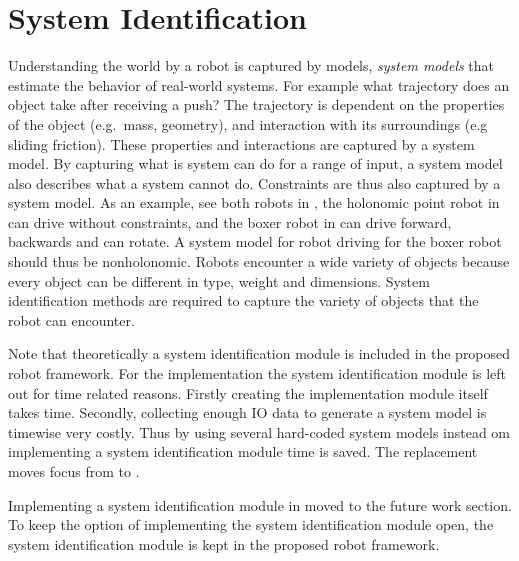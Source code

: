 \section{System Identification}%
\label{sec:sys_iden}
Understanding the world by a robot is captured by models, \textit{system models} that estimate the behavior of real-world systems. For example what trajectory does an object take after receiving a push? The trajectory is dependent on the properties of the object (e.g.~mass, geometry), and interaction with its surroundings (e.g sliding friction). These properties and interactions are captured by a system model. By capturing what is system can do for a range of input, a system model also describes what a system cannot do. Constraints are thus also captured by a system model. As an example, see both robots in , the holonomic point robot in  can drive without constraints, and the boxer robot in  can drive forward, backwards and can rotate. A system model for robot driving for the boxer robot should thus be nonholonomic. Robots encounter a wide variety of objects because every object can be different in type, weight and dimensions. System identification methods are required to capture the variety of objects that the robot can encounter.\bs




Note that theoretically a system identification module is included in the proposed robot framework. For the implementation the system identification module is left out for time related reasons. Firstly creating the implementation module itself takes time. Secondly, collecting enough \ac{IO} data to generate a system model is timewise very costly. Thus by using several hard-coded system models instead om implementing a system identification module time is saved. The replacement moves focus from  to .\bs

Implementing a system identification module in moved to the future work section. To keep the option of implementing the system identification module open, the system identification module is kept in the proposed robot framework.\bs
